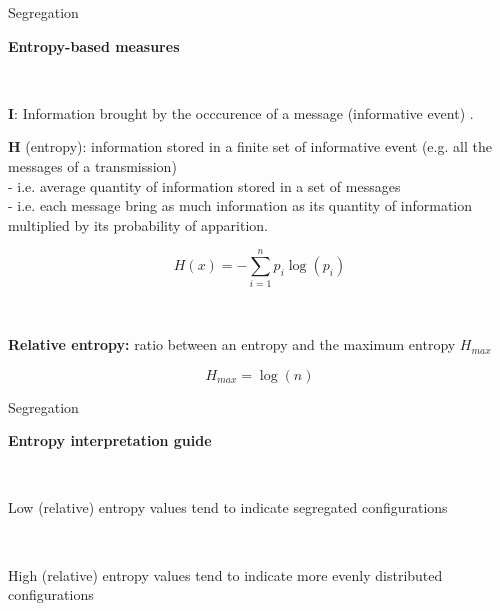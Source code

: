 \begin{frame}{Segregation}

\textbf{Entropy-based measures}

~ 

\textbf{I}: Information brought by the occcurence of a message (informative event) . 

\textbf{H} (entropy): information stored in a finite set of informative event (e.g. all the messages of a transmission) \\ 
- i.e. average quantity of information stored in a set of messages \\ 
- i.e. each message bring as much information as its quantity of information multiplied by its probability of apparition.

\begin{equation}
  H(x) = - \sum\limits_{i=1}^n p_i \log(p_i)
  \nonumber
\end{equation}

~

\textbf{Relative entropy:} ratio between an entropy and the maximum entropy $H_{max}$

\begin{equation}
  H_{max} = \log(n)
  \nonumber
\end{equation}

\end{frame}



\begin{frame}{Segregation}

\textbf{Entropy interpretation guide}

~ 

Low (relative) entropy values tend to indicate segregated configurations

~

High (relative) entropy values tend to indicate more evenly distributed configurations



\end{frame}




